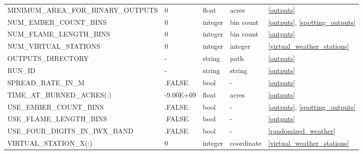 \begin{landscape}
\begin{center}
\begin{longtable}{lllll}
MINIMUM\_AREA\_FOR\_BINARY\_OUTPUTS          & 0                          & float                  & acres                              & \ref{outputs}                        \\
NUM\_EMBER\_COUNT\_BINS                      & 0                          & integer                & bin count                          & \ref{outputs}, \ref{spotting_outputs}                       \\
NUM\_FLAME\_LENGTH\_BINS                     & 0                          & integer                & bin count                          & \ref{outputs}                        \\
NUM\_VIRTUAL\_STATIONS                       & 0                          & integer                & integer                            & \ref{virtual_weather_stations}       \\
OUTPUTS\_DIRECTORY                           & -                          & string                 & path                               & \ref{outputs}                        \\
RUN\_ID                                      & -                          & string                 & string                             & \ref{outputs}                        \\
SPREAD\_RATE\_IN\_M                          & .FALSE.                    & bool                   & -                                  & \ref{outputs}                        \\
TIME\_AT\_BURNED\_ACRES(:)                   & -9.00E+09                  & float                  & acres                              & \ref{outputs}                        \\
USE\_EMBER\_COUNT\_BINS                      & .FALSE.                    & bool                   & -                                  & \ref{outputs}, \ref{spotting_outputs}                       \\
USE\_FLAME\_LENGTH\_BINS                     & .FALSE.                    & bool                   & -                                  & \ref{outputs}                        \\
USE\_FOUR\_DIGITS\_IN\_IWX\_BAND             & .FALSE.                    & bool                   & -                                  & \ref{randomized_weather}             \\
VIRTUAL\_STATION\_X(:)                       & 0                          & integer                & coordinate                         & \ref{virtual_weather_stations}       \\

\end{longtable}
\end{center}
\end{landscape}
